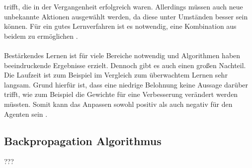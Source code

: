 trifft, die in der Vergangenheit erfolgreich waren. Allerdings müssen auch neue unbekannte Aktionen ausgewählt werden, da diese unter Umständen besser sein können. Für ein gutes Lernverfahren ist es notwendig, eine Kombination aus beidem zu ermöglichen \cite{sutton2018reinforcement}.
\\\\
Bestärkendes Lernen ist für viele Bereiche notwendig und Algorithmen haben beeindruckende Ergebnisse erzielt. Dennoch gibt es auch einen großen Nachteil. Die Laufzeit ist zum Beispiel im Vergleich zum überwachtem Lernen sehr langsam. Grund hierfür ist, dass eine niedrige Belohnung keine Aussage darüber trifft, wie zum Beispiel die Gewichte für eine Verbesserung verändert werden müssten.
Somit kann das Anpassen sowohl positiv als auch negativ für den Agenten sein \cite{zell2003simulation}. 


\subsection{Backpropagation Algorithmus}
???


